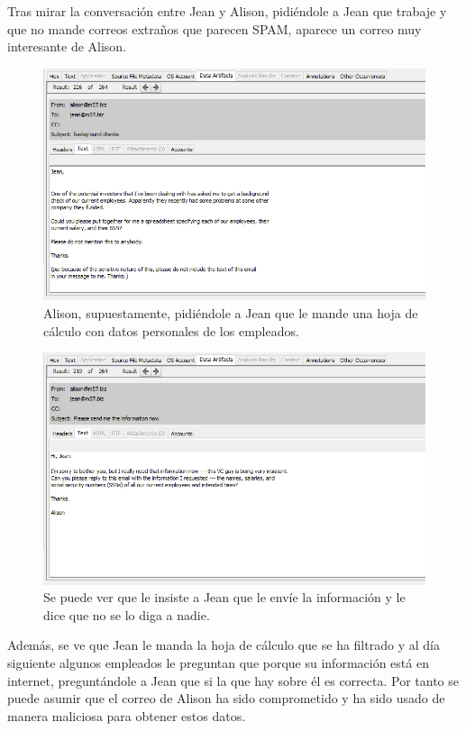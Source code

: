 \documentclass{article}
\begin{document}
Tras mirar la conversación entre Jean y Alison, pidiéndole a Jean que trabaje y que no mande correos extraños que parecen SPAM, aparece un correo muy interesante de Alison.

\begin{figure}[H]
    \centering
    \includegraphics[width=\textwidth]{imagenes/Windows/Captura de pantalla (9).png}
    \caption{Alison, supuestamente, pidiéndole a Jean que le mande una hoja de cálculo con datos personales de los empleados.}
\end{figure}

\begin{figure}[H]
    \centering
    \includegraphics[width=\textwidth]{imagenes/Windows/Captura de pantalla (10).png}
    \caption{Se puede ver que le insiste a Jean que le envíe la información y le dice que no se lo diga a nadie.}
\end{figure}

Además, se ve que Jean le manda la hoja de cálculo que se ha filtrado y al día siguiente algunos empleados le preguntan que porque su información está en internet, preguntándole a Jean que si la que hay sobre él es correcta. Por tanto se puede asumir que el correo de Alison ha sido comprometido y ha sido usado de manera maliciosa para obtener estos datos.
\end{document}
